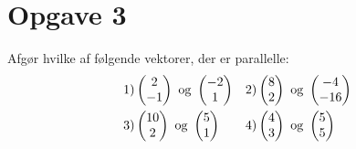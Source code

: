 \section*{Opgave 3}
Afgør hvilke af følgende vektorer, der er parallelle:
\begin{align*}
	&1)\begin{pmatrix}2 \\ -1\end{pmatrix} \textnormal{ og } \begin{pmatrix}-2 \\ 1\end{pmatrix} 		&&2)\begin{pmatrix}8 \\ 2\end{pmatrix} \textnormal{ og } \begin{pmatrix}-4 \\ -16\end{pmatrix}   	\\
	&3)\begin{pmatrix}10 \\ 2\end{pmatrix} \textnormal{ og } \begin{pmatrix}5 \\ 1\end{pmatrix} 		&&4)\begin{pmatrix} 4 \\ 3\end{pmatrix} \textnormal{ og } \begin{pmatrix}5 \\ 5\end{pmatrix}   	\\
\end{align*}

